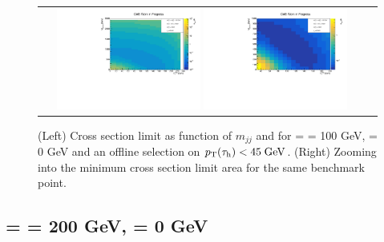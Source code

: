 \begin{figure}[tbh!]
	\centering
	\begin{tabular}{cc}
		\includegraphics[width=0.45\textwidth]{analysis/pics/JetInvMass_vs_MET_xsec_chi100_lsp000_taupt45.pdf}
		\includegraphics[width=0.45\textwidth]{analysis/pics/JetInvMass_vs_MET_xsec_chi100_lsp000_taupt45_zoom.pdf}
	\end{tabular}
	\caption{(Left) Cross section limit as function of $m_{jj}$ and \met for \charginopm = \neutralinotwo = 100 GeV, \neutralinoone = 0 GeV and an offline selection on $p_{\text{T}}(\tau_{\text{h}}) <  45\;\text{Ge}\kern-0.06667em\text{V}$. (Right) Zooming into the minimum cross section limit area for the same benchmark point.}
	\label{fig::JetInvMass_vs_MET_xsec_chi100_lsp000_taupt45}
\end{figure}

\FloatBarrier

\subsection*{\charginopm = \neutralinotwo = 200 GeV, \neutralinoone = 0 GeV}

\FloatBarrier

